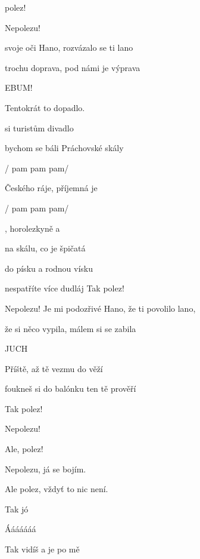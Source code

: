 

 polez!

Nepolezu!

\zs
{} svoje oči Hano, rozvázalo se ti lano

 trochu doprava, pod námi je výprava

EBUM!

Tentokrát to  dopadlo.

 si turistům  divadlo   
\ks

\zr
{} bychom se báli  Práchovské skály

   / pam pam pam/

 Českého ráje,  příjemná je

   / pam pam pam/

, horolezkyně a 

 na skálu, co je  špičatá

 do písku a  rodnou vísku

nespatříte více dudláj 
\kr
Tak polez!

Nepolezu!
\zs
Je mi podozřivé Hano, že ti povolilo lano,

že si něco vypila, málem si se zabila

JUCH

Příště, až tě vezmu do věží

foukneš si do balónku ten tě prověří
\ks

\zr	\kr

Tak polez!

Nepolezu!

Ale, polez!

Nepolezu, já se bojím.

Ale polez, vždyť to nic není.

Tak jó

Ááááááá

Tak vidíš a je po mě

\kp


